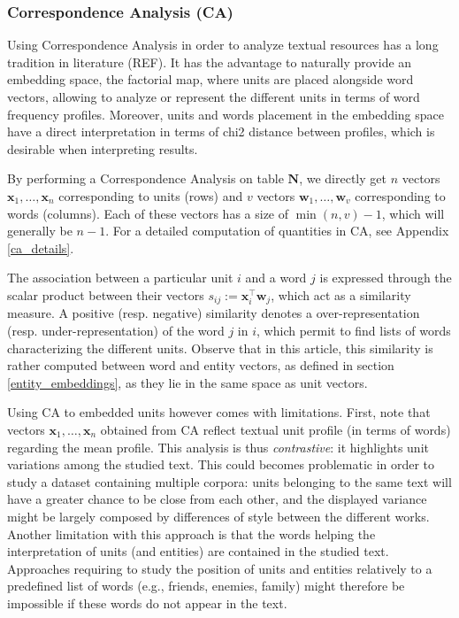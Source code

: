 \documentclass[
twocolumn,
]{ceurart}
\begin{document}
\subsubsection{Correspondence Analysis (CA)}
\label{ca_method}

Using Correspondence Analysis in order to analyze textual resources has a long tradition in literature (REF). It has the advantage to naturally provide an embedding space, the factorial map, where units are placed alongside word vectors, allowing to analyze or represent the different units in terms of word frequency profiles. Moreover, units and words placement in the embedding space have a direct interpretation in terms of chi2 distance between profiles, which is desirable when interpreting results.

By performing a Correspondence Analysis on table $\mathbf{N}$, we directly get $n$ vectors $\mathbf{x}_1, \ldots, \mathbf{x}_n$ corresponding to units (rows) and $v$ vectors $\mathbf{w}_1, \ldots, \mathbf{w}_v$ corresponding to words (columns). Each of these vectors has a size of $\min(n, v) - 1$, which will generally be $n - 1$. For a detailed computation of quantities in CA, see Appendix \ref{ca_details}. 

The association between a particular unit $i$ and a word $j$ is expressed through the scalar product between their vectors $s_{ij} := \mathbf{x}^\top_i \mathbf{w}_j$, which act as a similarity measure. A positive (resp. negative) similarity denotes a over-representation (resp. under-representation) of the word $j$ in $i$, which permit to find lists of words characterizing the different units. Observe that in this article, this similarity is rather computed between word and entity vectors, as defined in section \ref{entity_embeddings}, as they lie in the same space as unit vectors. 

Using CA to embedded units however comes with limitations. First, note that vectors $\mathbf{x}_1, \ldots, \mathbf{x}_n$ obtained from CA reflect textual unit profile (in terms of words) regarding the mean profile. This analysis is thus \emph{contrastive}: it highlights unit variations among the studied text. This could becomes problematic in order to study a dataset containing multiple corpora: units belonging to the same text will have a greater chance to be close from each other, and the displayed variance might be largely composed by differences of style between the different works. Another limitation with this approach is that the words helping the interpretation of units (and entities) are contained in the studied text. Approaches requiring to study the position of units and entities relatively to a predefined list of words (e.g., friends, enemies, family) might therefore be impossible if these words do not appear in the text.
\end{document}
